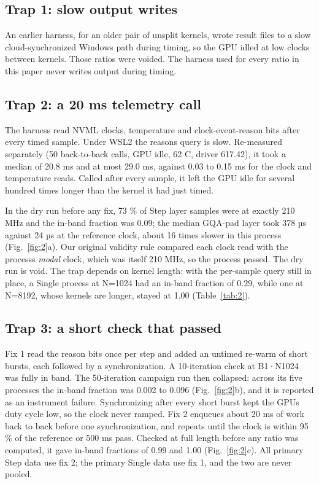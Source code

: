\documentclass[conference]{IEEEtran}
\begin{document}
\subsection{Trap 1: slow output writes}

An earlier harness, for an older pair of unsplit kernels, wrote result files to a slow cloud-synchronized Windows path during timing, so the GPU idled at low clocks between kernels. Those ratios were voided. The harness used for every ratio in this paper never writes output during timing.

\subsection{Trap 2: a 20 ms telemetry call}

The harness read NVML clocks, temperature and clock-event-reason bits after every timed sample. Under WSL2 the reasons query is slow. Re-measured separately (50 back-to-back calls, GPU idle, 62 C, driver 617.42), it took a median of 20.8 ms and at most 29.0 ms, against 0.03 to 0.15 ms for the clock and temperature reads. Called after every sample, it left the GPU idle for several hundred times longer than the kernel it had just timed.

In the dry run before any fix, 73 \% of Step layer samples were at exactly 210 MHz and the in-band fraction was 0.09; the median GQA-pad layer took 378 µs against 24 µs at the reference clock, about 16 times slower in this process (Fig.~\ref{fig:2}a). Our original validity rule compared each clock read with the process\textquotesingle s \emph{modal} clock, which was itself 210 MHz, so the process passed. The dry run is void. The trap depends on kernel length: with the per-sample query still in place, a Single process at N=1024 had an in-band fraction of 0.29, while one at N=8192, whose kernels are longer, stayed at 1.00 (Table~\ref{tab:2}).

\subsection{Trap 3: a short check that passed}

Fix 1 read the reason bits once per step and added an untimed re-warm of short bursts, each followed by a synchronization. A 10-iteration check at B1·N1024 was fully in band. The 50-iteration campaign run then collapsed: across its five processes the in-band fraction was 0.002 to 0.096 (Fig.~\ref{fig:2}b), and it is reported as an instrument failure. Synchronizing after every short burst kept the GPU\textquotesingle s duty cycle low, so the clock never ramped. Fix 2 enqueues about 20 ms of work back to back before one synchronization, and repeats until the clock is within 95 \% of the reference or 500 ms pass. Checked at full length before any ratio was computed, it gave in-band fractions of 0.99 and 1.00 (Fig.~\ref{fig:2}c). All primary Step data use fix 2; the primary Single data use fix 1, and the two are never pooled.
\end{document}
